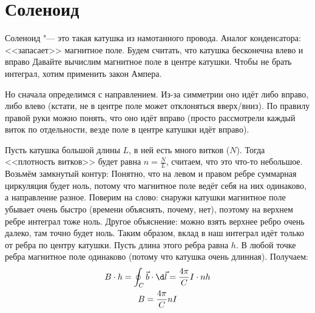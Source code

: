 \section{Соленоид}
	Соленоид "--- это такая катушка из намотанного провода.
	Аналог конденсатора: <<запасает>> магнитное поле.
	Будем считать, что катушка бесконечна влево и вправо
	Давайте вычислим магнитное поле в центре катушки.
	Чтобы не брать интеграл, хотим применить закон Ампера.

	Но сначала определимся с направлением.
	Из-за симметрии оно идёт либо вправо, либо влево
	(кстати, не в центре поле может отклоняться вверх/вниз).
	По правилу правой руки можно понять, что оно идёт вправо
	(просто рассмотрели каждый виток по отдельности, везде поле в центре катушки идёт вправо).

	Пусть катушка большой длины $L$, в ней есть много витков ($N$).
	Тогда <<плотность витков>> будет равна $n=\frac NL$, считаем, что это что-то небольшое.
	Возьмём замкнутый контур:
	Понятно, что на левом и правом ребре суммарная циркуляция будет ноль, потому что магнитное
	поле ведёт себя на них одинаково, а направление разное.
	Поверим на слово: снаружи катушки магнитное поле убывает очень быстро (времени объяснять, почему, нет),
	поэтому на верхнем ребре интеграл тоже ноль.
	Другое объяснение: можно взять верхнее ребро очень далеко, там точно будет ноль.
	Таким образом, вклад в наш интеграл идёт только от ребра по центру катушки.
	Пусть длина этого ребра равна $h$.
	В любой точке ребра магнитное поле одинаково (потому что катушка очень длинная).
	Получаем:
	\begin{gather*}
		B \cdot h = \oint_C \vec b \cdot \d \vec l = \frac{4\pi}{C} I \cdot nh \\
		B = \frac{4\pi}{C} n I
	\end{gather*}

